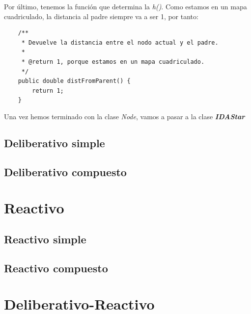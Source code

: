 \documentclass[11pt,a4paper]{article}
\begin{document}
Por último, tenemos la función que determina la \textit{h()}. Como estamos en un mapa cuadriculado, la distancia
al padre siempre va a ser 1, por tanto:
\newline
\begin{lstlisting}
    /**
     * Devuelve la distancia entre el nodo actual y el padre.
     *
     * @return 1, porque estamos en un mapa cuadriculado.
     */
    public double distFromParent() {
    	return 1;
    }
\end{lstlisting}

Una vez hemos terminado con la clase \textit{Node}, vamos a pasar a la clase \textbf{\textit{IDAStar}}



\subsection{Deliberativo simple}

\subsection{Deliberativo compuesto}



\newpage

\section{Reactivo}

\subsection{Reactivo simple}

\subsection{Reactivo compuesto}



\newpage

\section{Deliberativo-Reactivo}
\end{document}
